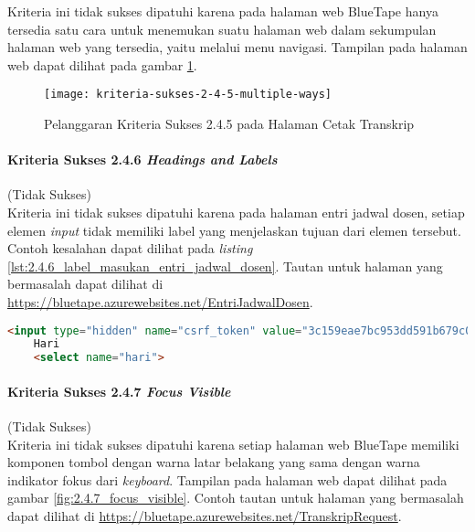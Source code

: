 Kriteria ini tidak sukses dipatuhi karena pada halaman web BlueTape hanya tersedia satu cara untuk menemukan suatu halaman web dalam sekumpulan halaman web yang tersedia, yaitu melalui menu navigasi. Tampilan pada halaman web dapat dilihat pada gambar \ref{fig:2.4.5_multiple_ways}.

\begin{figure}[H]
    \centering  
    \texttt{[image: kriteria-sukses-2-4-5-multiple-ways]}  
    \caption[Pelanggaran Kriteria Sukses 2.4.5 pada Halaman Cetak Transkrip]{Pelanggaran Kriteria Sukses 2.4.5 pada Halaman Cetak Transkrip}
    \label{fig:2.4.5_multiple_ways}  
\end{figure}

\paragraph{Kriteria Sukses 2.4.6 \textit{Headings and Labels}}
\label{par:kepatuhan_bluetape_kriteria_sukses_2.4.6}
(Tidak Sukses)\\

Kriteria ini tidak sukses dipatuhi karena pada halaman entri jadwal dosen, setiap elemen \textit{input} tidak memiliki label yang menjelaskan tujuan dari elemen tersebut. Contoh kesalahan dapat dilihat pada \textit{listing} \ref{lst:2.4.6_label_masukan_entri_jadwal_dosen}. Tautan untuk halaman yang bermasalah dapat dilihat di \url{https://bluetape.azurewebsites.net/EntriJadwalDosen}.

\begin{lstlisting}[frame=single, label={lst:2.4.6_label_masukan_entri_jadwal_dosen}, language=HTML, caption=Pelanggaran Kriteria Sukses 2.4.6 pada Halaman Entri Jadwal Dosen]
    <input type="hidden" name="csrf_token" value="3c159eae7bc953dd591b679c080ed066"/>
    Hari
    <select name="hari">
\end{lstlisting}

\paragraph{Kriteria Sukses 2.4.7 \textit{Focus Visible}}
\label{par:kepatuhan_bluetape_kriteria_sukses_2.4.7}
(Tidak Sukses)\\

Kriteria ini tidak sukses dipatuhi karena setiap halaman web BlueTape memiliki komponen tombol dengan warna latar belakang yang sama dengan warna indikator fokus dari \textit{keyboard}. Tampilan pada halaman web dapat dilihat pada gambar \ref{fig:2.4.7_focus_visible}. Contoh tautan untuk halaman yang bermasalah dapat dilihat di \url{https://bluetape.azurewebsites.net/TranskripRequest}. 

